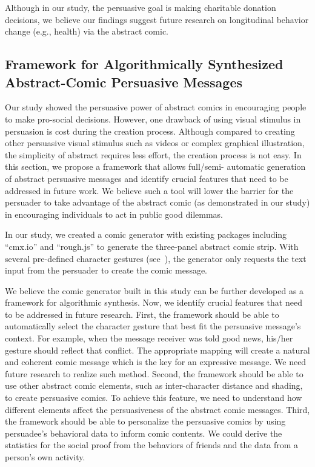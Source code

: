 Although in our study, the persuasive goal is making charitable donation decisions, we believe our findings suggest future research on longitudinal behavior change (e.g., health) via the abstract comic. 

 \subsection{Framework for Algorithmically Synthesized Abstract-Comic Persuasive Messages}
 
Our study showed the persuasive power of abstract comics in encouraging people to make pro-social decisions. However, one drawback of using visual stimulus in persuasion is cost during the creation process. Although compared to creating other persuasive visual stimulus such as videos or complex graphical illustration, the simplicity of abstract requires less effort, the creation process is not easy. In this section, we propose a framework that allows full/semi- automatic generation of abstract persuasive messages and identify crucial features that need to be addressed in future work. We believe such a tool will lower the barrier for the persuader to take advantage of the abstract comic (as demonstrated in our study) in encouraging individuals to act in public good dilemmas.

In our study, we created a comic generator with existing packages including ``cmx.io'' \cite{cmx.io} and ``rough.js'' \cite{rough.js} to generate the three-panel abstract comic strip. With several pre-defined character gestures (see~), the generator only requests the text input from the persuader to create the comic message.  

We believe the comic generator built in this study can be further developed as a framework for algorithmic synthesis. Now, we identify crucial features that need to be addressed in future research. First, the framework should be able to automatically select the character gesture that best fit the persuasive message's context. For example, when the message receiver was told good news, his/her gesture should reflect that conflict. The appropriate mapping will create a natural and coherent comic message which is the key for an expressive message. We need future research to realize such method. Second, the framework should be able to use other abstract comic elements, such as inter-character distance and shading, to create persuasive comics. To achieve this feature, we need to understand how different elements affect the persuasiveness of the abstract comic messages. Third, the framework should be able to personalize the persuasive comics by using persuadee's behavioral data to inform comic contents. We could derive the statistics for the social proof from the behaviors of friends and the data from a person's own activity.

